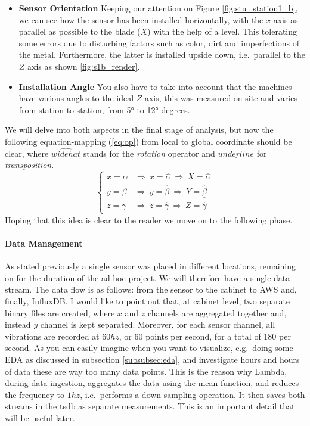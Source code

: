 \begin{itemize}
    \item \textbf{Sensor Orientation} 
    Keeping our attention on Figure \ref{fig:stu_station1_b}, we can see how the sensor has been installed horizontally, with the $x$-axis as parallel as possible to the blade ($X$) with 
    the help of a level. This tolerating some errors due to disturbing factors such as color, dirt and imperfections of the metal.
    Furthermore, the latter is installed upside down, i.e.\ parallel to the $Z$ axis as shown \ref{fig:s1b_render}.
    \item \textbf{Installation Angle}
    You also have to take into account that the machines have various angles to the ideal $Z$-axis, this was measured on site and varies from station to station, from 5° to 12° degrees.
\end{itemize}
We will delve into both aspects in the final stage of analysis, but now the following equation-mapping (\ref{eq:op}) from local to global coordinate should be clear, 
where $\widehat{widehat}$ stands for the \textit{rotation} operator and $\underline{underline}$ for \textit{transposition}.
\begin{equation}
    \left\{ \begin{array}{cl}
        x = \alpha & \Rightarrow  \ x = \widehat{\alpha} \ \Rightarrow  \ X = \underline{\widehat{\alpha}} \\
        y = \beta & \Rightarrow  \ y = \widehat{\beta} \ \Rightarrow  \ Y = \underline{\widehat{\beta}} \\ 
        z = \gamma & \Rightarrow  \ z = \widehat{\gamma} \ \Rightarrow  \ Z = \underline{\widehat{\gamma}}
        \end{array} \right.
    \label{eq:op}
\end{equation}
Hoping that this idea is clear to the reader we move on to the following phase.

\paragraph{Data Management}
As stated previously a single sensor was placed in different locations, remaining on for the duration of the ad hoc project. We will therefore have a single data stream.
The data flow is as follows: from the sensor to the cabinet to AWS and, finally, InfluxDB.
I would like to point out that, at cabinet level, two separate binary files are created, where $x$ and $z$ channels are aggregated together and, instead $y$ channel is kept separated. 
Moreover, for each sensor channel, all vibrations are recorded at $60hz$, or 60 points per second, for a total of 180 per second.
As you can easily imagine when you want to visualize, e.g.\ doing some \ac{EDA} as discussed in subsection \ref{subsubsec:eda}, 
and investigate hours and hours of data these are way too many data points.
This is the reason why Lambda, during data ingestion, aggregates the data using the mean function, and reduces the frequency to $1hz$, i.e.\ 
performs a down sampling operation. It then saves both streams in the \ac{tsdb} as separate measurements. This is an important detail that will be useful later.

